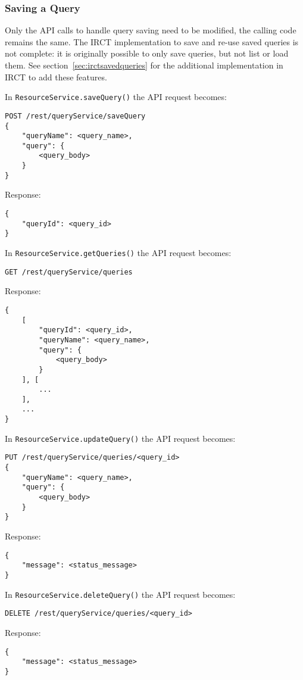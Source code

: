\subsubsection{Saving a Query}
Only the API calls to handle query saving need to be modified, the calling code remains the same.
The IRCT implementation to save and re-use saved queries is not complete: it is originally possible to only save queries, but not list or load them. 
See section~\ref{sec:irctsavedqueries} for the additional implementation in IRCT to add these features.

In \verb|ResourceService.saveQuery()| the API request becomes:
\begin{verbatim}
POST /rest/queryService/saveQuery
{
    "queryName": <query_name>,
    "query": {
        <query_body>
    }
}    
\end{verbatim}

Response:
\begin{verbatim}
{
    "queryId": <query_id>
}    
\end{verbatim}

In  \verb|ResourceService.getQueries()| the API request becomes:
\begin{verbatim}
GET /rest/queryService/queries
\end{verbatim}

Response:
\begin{verbatim}
{
    [
        "queryId": <query_id>,
        "queryName": <query_name>,
        "query": {
            <query_body>
        }
    ], [
        ...
    ],
    ...
}    
\end{verbatim}

In  \verb|ResourceService.updateQuery()| the API request becomes:
\begin{verbatim}
PUT /rest/queryService/queries/<query_id>
{
    "queryName": <query_name>,
    "query": {
        <query_body>
    }
}
\end{verbatim}

Response:
\begin{verbatim}
{
    "message": <status_message>
} 
\end{verbatim}

In  \verb|ResourceService.deleteQuery()| the API request becomes:
\begin{verbatim}
DELETE /rest/queryService/queries/<query_id>
\end{verbatim}

Response:
\begin{verbatim}
{
    "message": <status_message>
} 
\end{verbatim}


